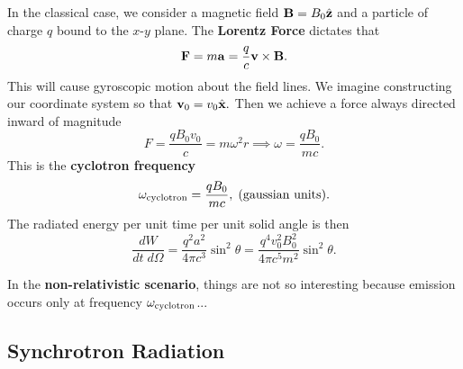 In the classical case, we consider a magnetic field ${\bf B} = B_0 \hat{\bf z}$ and a particle of charge $q$ bound to the $x$-$y$ plane. The \textbf{Lorentz Force} dictates that
\[
{\bf F} = m {\bf a} = \frac{q}{c}{\bf v} \times {\bf B}.
\]
This will cause gyroscopic motion about the field lines. We imagine constructing our coordinate system so that ${\bf v}_0 = v_0 \hat{\bf x}.$ Then we achieve a force always directed inward of magnitude
\[
F = \frac{qB_0v_0}{c} = m\omega^2 r \implies \omega = \frac{qB_0}{mc}.
\]
This is the \textbf{cyclotron frequency}
\begin{equation}
    \label{eq:cyclotron_frequency}
    \omega_{\rm cyclotron} = \frac{qB_0}{mc},\;\text{(gaussian units)}.
\end{equation}
The radiated energy per unit time per unit solid angle is then
\[
\frac{dW}{dt\;d\Omega} = \frac{q^2 a^2}{4\pi c^3} \sin^2 \theta =\frac{q^4 v_0^2 B_0^2}{4\pi c^5m^2} \sin^2\theta.
\]
\begin{remark}
    In the \textbf{non-relativistic scenario}, things are not so interesting because emission occurs only at frequency $\omega_{\rm cyclotron}$...
\end{remark}

\subsection{Synchrotron Radiation}

